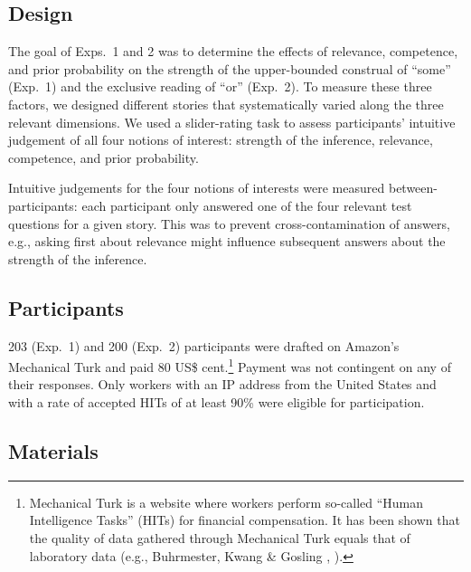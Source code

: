 \documentclass[12pt]{article}
\begin{document}
\subsection*{Design}

The goal of Exps.\ 1 and 2 was to determine the effects of relevance, competence, and prior probability on the strength of the upper-bounded construal of ``some'' (Exp.\ 1) and the exclusive reading of ``or'' (Exp.\ 2). To measure these three factors, we designed different stories that systematically varied along the three relevant dimensions. We used a slider-rating task to assess participants' intuitive judgement of all four notions of interest: strength of the inference, relevance, competence, and prior probability.

Intuitive judgements for the four notions of interests were measured between-participants: each participant only answered one of the four relevant test questions for a given story. This was to prevent cross-contamination of answers, e.g., asking first about relevance might influence subsequent answers about the strength of the inference.

\subsection*{Participants}

203 (Exp.\ 1) and 200 (Exp.\ 2) participants were drafted on Amazon's Mechanical Turk and paid 80 US\$ cent.\footnote{Mechanical Turk is a website where workers perform so-called ``Human Intelligence Tasks'' (HITs) for financial compensation. It has been shown that the quality of data gathered through Mechanical Turk equals that of laboratory data (e.g., Buhrmester, Kwang \& Gosling \citeyear{buhrmester2011}, \citealt{schnoebelen2010, sprouse2011}).} Payment was not contingent on any of their responses. Only workers with an IP address from the United States and with a rate of accepted HITs of at least 90\% were eligible for participation.

\subsection*{Materials}
\end{document}

